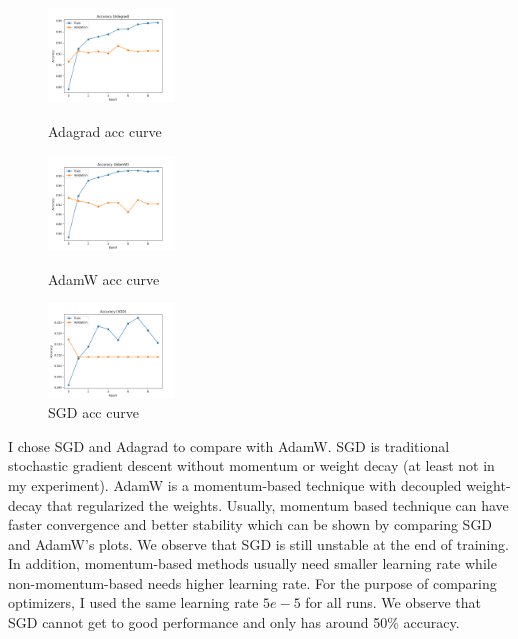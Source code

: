 \documentclass{article}
\newenvironment{solution}{\color{blue}}{}
\begin{document}
\begin{itemize}
\begin{itemize}
    \begin{figure}[!htbp]
      \centering
      \begin{subcaptiongroup}
        \centering
        \parbox[b]{.3\textwidth}{%
        \centering
        \includegraphics[width=0.3\textwidth]{acc_curve_epoch_10_Adagrad.png}
        \caption{Adagrad acc curve}\label{Adagrad-acc}}%
        \parbox[b]{.3\textwidth}{%
        \centering
        \includegraphics[width=0.3\textwidth]{acc_curve_epoch_10_AdamW.png}
        \caption{AdamW acc curve}\label{AdamW-acc}}%
        \centering
        \parbox[b]{.3\textwidth}{
        \centering
        \includegraphics[width=0.3\textwidth]{acc_curve_epoch_10_SGD.png}
        \caption{SGD acc curve}\label{SGD-acc}}
      \end{subcaptiongroup}
    \end{figure}

    \begin{solution}
      I chose SGD and Adagrad to compare with AdamW. SGD is traditional stochastic gradient descent without momentum or weight decay (at least not in my experiment). AdamW is a momentum-based technique with decoupled weight-decay that regularized the weights. Usually, momentum based technique can have faster convergence and better stability which can be shown by comparing SGD and AdamW's plots. We observe that SGD is still unstable at the end of training. In addition, momentum-based methods usually need smaller learning rate while non-momentum-based needs higher learning rate. For the purpose of comparing optimizers, I used the same learning rate $5e-5$ for all runs. We observe that SGD cannot get to good performance and only has around 50\% accuracy. 


\end{solution}
\end{itemize}
\end{itemize}
\end{document}
